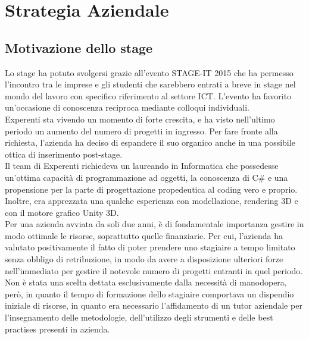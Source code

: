 \section{Strategia Aziendale}
\subsection{Motivazione dello stage}
Lo stage ha potuto svolgersi grazie all'evento STAGE-IT 2015 che ha permesso l'incontro tra le imprese e gli studenti che sarebbero entrati a breve in stage nel mondo del lavoro con specifico riferimento al settore ICT. L'evento ha favorito un'occasione di conoscenza reciproca mediante colloqui individuali.
\\
Experenti sta vivendo un momento di forte crescita, e ha visto nell'ultimo periodo un aumento del numero di progetti in ingresso. Per fare fronte alla richiesta, l'azienda ha deciso di espandere il suo organico anche in una possibile ottica di inserimento post-stage.
\\
Il team di Experenti richiedeva un laureando in Informatica che possedesse un’ottima capacità di programmazione ad oggetti, la conoscenza di C\# e una propensione per la parte di progettazione propedeutica al coding vero e proprio.
Inoltre, era apprezzata una qualche esperienza con modellazione, rendering 3D e con il motore grafico Unity 3D.
\\
Per una azienda avviata da soli due anni, \`e di fondamentale importanza gestire in modo ottimale le risorse, soprattutto quelle finanziarie. Per cui, l'azienda ha valutato positivamente il fatto di poter prendere uno stagiaire a tempo limitato senza obbligo di retribuzione, in modo da avere a disposizione ulteriori forze nell'immediato per gestire il notevole numero di progetti entranti in quel periodo. 
\\
Non \`e stata una scelta dettata esclusivamente dalla necessit\`a di manodopera, per\`o, in quanto il tempo di formazione dello stagiaire comportava un dispendio iniziale di risorse, in quanto era necessario l'affidamento di un tutor aziendale per l'insegnamento delle metodologie, dell'utilizzo degli strumenti e delle best practises presenti in azienda.
